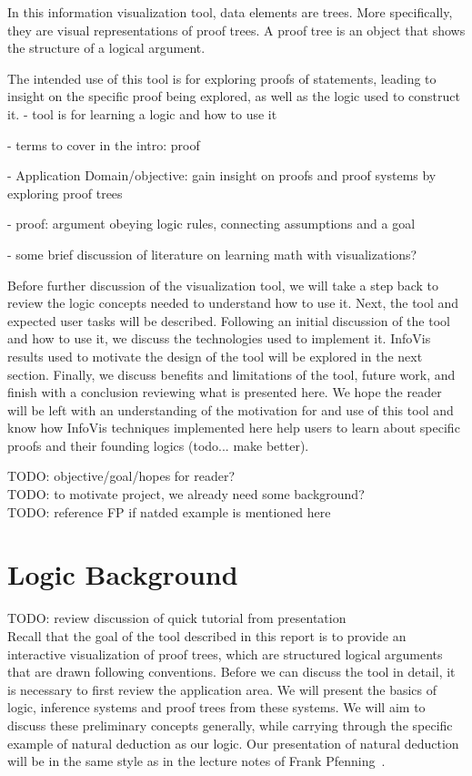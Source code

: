 \documentclass[conference]{IEEEtran}
\begin{document}
In this information visualization tool, data elements are trees. More specifically, they are visual representations of proof trees. A proof tree is an object that shows the structure of a logical argument.

The intended use of this tool is for exploring proofs of statements, leading to insight on the specific proof being explored, as well as the logic used to construct it.
- tool is for learning a logic and how to use it

- terms to cover in the intro: proof

- Application Domain/objective: gain insight on proofs and proof systems by exploring proof trees

- proof: argument obeying logic rules, connecting assumptions and a goal

- some brief discussion of literature on learning math with visualizations?

Before further discussion of the visualization tool, we will take a step back to review the logic concepts needed to understand how to use it. Next, the tool and expected user tasks will be described. Following an initial discussion of the tool and how to use it, we discuss the technologies used to implement it. InfoVis results used to motivate the design of the tool will be explored in the next section. Finally, we discuss benefits and limitations of the tool, future work, and finish with a conclusion reviewing what is presented here. We hope the reader will be left with an understanding of the motivation for and use of this tool and know how InfoVis techniques implemented here help users to learn about specific proofs and their founding logics (todo... make better).

TODO: objective/goal/hopes for reader? \\

TODO: to motivate project, we already need some background? \\

TODO: reference FP if natded example is mentioned here \\

\section{Logic Background}
\label{sec:background}

TODO: review discussion of quick tutorial from presentation \\

Recall that the goal of the tool described in this report is to provide an interactive visualization of proof trees, which are structured logical arguments that are drawn following conventions. Before we can discuss the tool in detail, it is necessary to first review the application area. We will present the basics of logic, inference systems and proof trees from these systems. We will aim to discuss these preliminary concepts generally, while carrying through the specific example of natural deduction as our logic. Our presentation of natural deduction will be in the same style as in the lecture notes of Frank Pfenning~\cite{natded-pfenning}.
\end{document}
